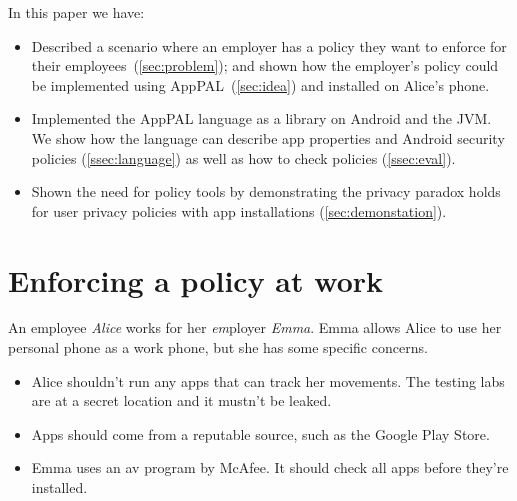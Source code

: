 \documentclass[]{llncs}
\begin{document}

\noindent
In this paper we have:
\begin{itemize}
  \item
    Described a scenario where an employer has a policy they want to enforce for their employees~(\autoref{sec:problem});
    and shown how the employer's policy could be implemented using AppPAL~(\autoref{sec:idea}) and installed on Alice's phone.
  \item
    Implemented the AppPAL language as a library on Android and the JVM.
    We show how the language can describe app properties and Android security policies (\autoref{ssec:language}) as well as how to check policies (\autoref{ssec:eval}).
  \item
    Shown the need for policy tools by demonstrating the privacy paradox holds for user privacy policies with app installations (\autoref{sec:demonstation}).
\end{itemize}

\section{Enforcing a policy at work}
\label{sec:problem}

An employee \emph{Alice} works for her \emph{em\/}ployer \emph{Emma}.
Emma allows Alice to use her personal phone as a work phone, but she has some specific concerns.
\begin{itemize}
  \item Alice shouldn't run any apps that can track her movements.
    The testing labs are at a secret location and it mustn't be leaked.
  \item Apps should come from a reputable source, such as the Google Play Store.
  \item Emma uses an \ac{av} program by McAfee.
    It should check all apps before they're installed.
\end{itemize}
\end{document}
